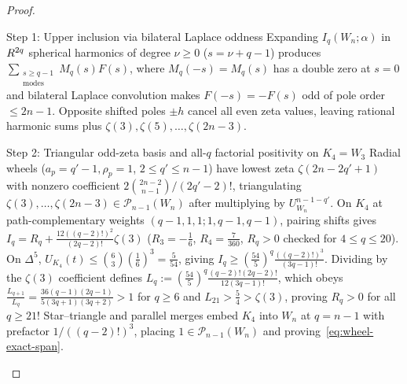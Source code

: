 \begin{proof}\leavevmode
\begin{proofpart}{Step 1: Upper inclusion via bilateral Laplace oddness}
Expanding $I_q(W_n;\alpha)$ in $R^{2q}$ spherical harmonics of degree $\nu \ge 0$ ($s = \nu+q-1$) produces $\sum_{\substack{s\ge q-1\\\mathrm{modes}}}M_q(s)F(s)$, where $M_q(-s) = M_q(s)$ has a double zero at $s=0$ and bilateral Laplace convolution makes $F(-s) = -F(s)$ odd of pole order $\le 2n-1$. Opposite shifted poles $\pm h$ cancel all even zeta values, leaving rational harmonic sums plus $\zeta(3),\zeta(5),\dots,\zeta(2n-3)$.
\end{proofpart}
\begin{proofpart}{Step 2: Triangular odd-zeta basis and all-$q$ factorial positivity on $K_4 = W_3$}
Radial wheels ($a_p = q'-1, \rho_p = 1$, $2 \le q' \le n-1$) have lowest zeta $\zeta(2n-2q'+1)$ with nonzero coefficient $2\binom{2n-2}{n-1}/(2q'-2)!$, triangulating $\zeta(3),\dots,\zeta(2n-3) \in \mathcal{P}_{n-1}(W_n)$ after multiplying by $U_{W_n}^{n-1-q'}$. On $K_4$ at path-complementary weights $(q-1,1,1;1,q-1,q-1)$, pairing shifts gives $I_q = R_q + \frac{12((q-2)!)^2}{(2q-2)!}\zeta(3)$ ($R_3 = -\frac{1}{6}$, $R_4 = \frac{7}{360}$, $R_q > 0$ checked for $4 \le q \le 20$). On $\Delta^5$, $U_{K_4}(t) \le \binom{6}{3}(\frac{1}{6})^3 = \frac{5}{54}$, giving $I_q \ge (\frac{54}{5})^q\frac{((q-2)!)^3}{(3q-1)!}$. Dividing by the $\zeta(3)$ coefficient defines $L_q := (\frac{54}{5})^q\frac{(q-2)!(2q-2)!}{12(3q-1)!}$, which obeys $\frac{L_{q+1}}{L_q} = \frac{36(q-1)(2q-1)}{5(3q+1)(3q+2)} > 1$ for $q \ge 6$ and $L_{21} > \frac{5}{4} > \zeta(3)$, proving $R_q > 0$ for all $q \ge 21$! Star--triangle and parallel merges embed $K_4$ into $W_n$ at $q=n-1$ with prefactor $1/((q-2)!)^3$, placing $1 \in \mathcal{P}_{n-1}(W_n)$ and proving~\eqref{eq:wheel-exact-span}.
\end{proofpart}
\end{proof}

